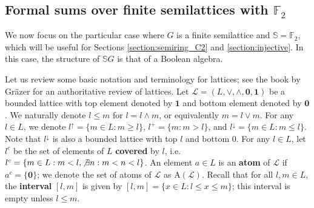 \documentclass[a4paper, 11pt]{article}
\theoremstyle{plain}
\theoremstyle{definition}
\newcommand{\F} {\mathbb{F}}
\newcommand{\Define}    [1] {\textbf{#1}}
\newcommand{\join}      {\lor}
\newcommand{\meet}      {\land}
\newcommand{\zero}      {\mathbf{0}}
\newcommand{\one}       {\mathbf{1}}
\newcommand{\Atoms}     {\mathrm{A}}
\begin{document}
\subsection{Formal sums over finite semilattices with $\F_2$} \label{subsection:semilattice_F2}


We now focus on the particular case where $G$ is a finite semilattice and $\mathbb{S} = \F_2$, which will be useful for Sections \ref{section:semiring_C2} and \ref{section:injective}. In this case, the structure of $\mathbb{S}G$ is that of a Boolean algebra.


Let us review some basic notation and terminology for lattices; see the book by Gr\"azer \cite{Gra03} for an authoritative review of lattices. Let $\mathcal{L} = ( L, \join, \meet, \zero, \one )$ be a bounded lattice with top element denoted by $\one$ and bottom element denoted by $\zero$. We naturally denote $l \le m$ for $l = l \meet m$, or equivalently $m = l \join m$. For any $l \in L$, we denote $l^\uparrow = \{ m \in L : m \ge l \}$, $l^+ = \{ m : m > l \}$, and $l^\downarrow = \{ m \in L : m \le l \}$. Note that $l^\downarrow$ is also a bounded lattice with top $l$ and bottom $0$. For any $l \in L$, let $l^c$ be the set of elements of $L$ \Define{covered} by $l$, i.e. $l^c = \{ m \in L : m < l, \not\exists n : m < n < l \}$. An element $a \in L$ is an \Define{atom} of $\mathcal{L}$ if $a^c = \{ \zero \}$; we denote the set of atoms of $\mathcal{L}$ as $\Atoms( \mathcal{L} )$. Recall that for all $l, m \in L$, the \Define{interval} $[l,m]$ is given by $[l,m] = \{ x \in L : l \le x \le m \}$; this interval is empty unless $l \le m$.
\end{document}
